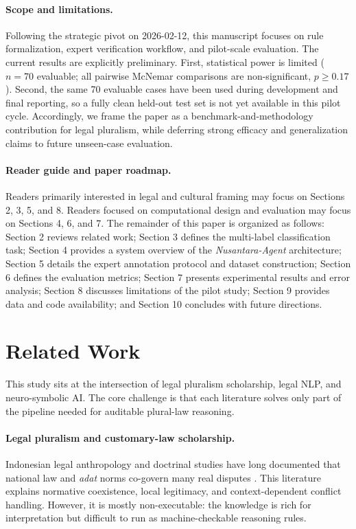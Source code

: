 \documentclass[11pt]{article}
\begin{document}
\paragraph{Scope and limitations.}
Following the strategic pivot on 2026-02-12, this manuscript focuses on rule formalization, expert verification workflow, and pilot-scale evaluation. The current results are explicitly preliminary. First, statistical power is limited ($n=70$ evaluable; all pairwise McNemar comparisons are non-significant, $p \geq 0.17$). Second, the same 70 evaluable cases have been used during development and final reporting, so a fully clean held-out test set is not yet available in this pilot cycle. Accordingly, we frame the paper as a benchmark-and-methodology contribution for legal pluralism, while deferring strong efficacy and generalization claims to future unseen-case evaluation.

\paragraph{Reader guide and paper roadmap.}
Readers primarily interested in legal and cultural framing may focus on Sections 2, 3, 5, and 8. Readers focused on computational design and evaluation may focus on Sections 4, 6, and 7. The remainder of this paper is organized as follows: Section 2 reviews related work; Section 3 defines the multi-label classification task; Section 4 provides a system overview of the \textit{Nusantara-Agent} architecture; Section 5 details the expert annotation protocol and dataset construction; Section 6 defines the evaluation metrics; Section 7 presents experimental results and error analysis; Section 8 discusses limitations of the pilot study; Section 9 provides data and code availability; and Section 10 concludes with future directions.

\section{Related Work}
This study sits at the intersection of legal pluralism scholarship, legal NLP, and neuro-symbolic AI. The core challenge is that each literature solves only part of the pipeline needed for auditable plural-law reasoning.

\paragraph{Legal pluralism and customary-law scholarship.}
Indonesian legal anthropology and doctrinal studies have long documented that national law and \textit{adat} norms co-govern many real disputes \cite{hooker1978adat,burns2004leiden}. This literature explains normative coexistence, local legitimacy, and context-dependent conflict handling. However, it is mostly non-executable: the knowledge is rich for interpretation but difficult to run as machine-checkable reasoning rules.
\end{document}
